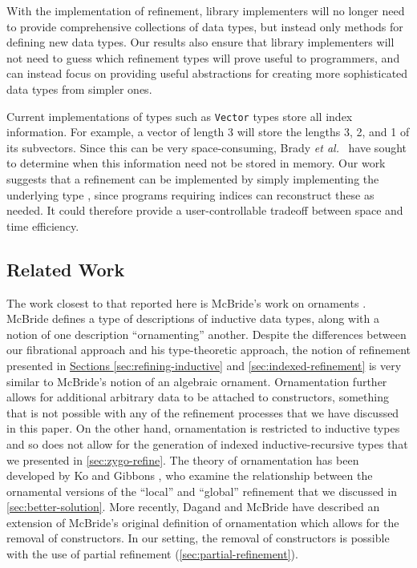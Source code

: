 \documentclass{LMCS}
\begin{document}
\vspace*{0.03in}

 With the implementation of refinement,
library implementers will no longer need to provide comprehensive
collections of data types, but instead only methods for defining new
data types. Our results also ensure that library implementers will not
need to guess which refinement types will prove useful to programmers,
and can instead focus on providing useful abstractions for creating
more sophisticated data types from simpler ones.

\vspace*{0.03in}

 Current implementations of types such
as {\tt Vector} types store all index information. For example, a
vector of length 3 will store the lengths 3, 2, and 1 of its
subvectors. Since this can be very space-consuming, Brady \emph{et
  al.}~\cite{brady03inductive} have sought to determine when this
information need not be stored in memory. Our work suggests that a
refinement  can be implemented by simply implementing
the underlying type , since programs requiring indices can
reconstruct these as needed. It could therefore provide a
user-controllable tradeoff between space and time efficiency.

\subsection{Related Work}

The work closest to that reported here is McBride's work on ornaments
\cite{mcbride10ornaments}. McBride defines a type of descriptions of
inductive data types, along with a notion of one description
``ornamenting'' another. Despite the differences between our
fibrational approach and his type-theoretic approach, the notion of
refinement presented in \hyperref[sec:refining-inductive]{Sections
  \ref*{sec:refining-inductive}} and
\hyperref[sec:indexed-refinement]{ \ref*{sec:indexed-refinement}} is
very similar to McBride's notion of an algebraic
ornament. Ornamentation further allows for additional arbitrary data
to be attached to constructors, something that is not possible with
any of the refinement processes that we have discussed in this
paper. On the other hand, ornamentation is restricted to inductive
types and so does not allow for the generation of indexed
inductive-recursive types that we presented in
\autoref{sec:zygo-refine}. The theory of ornamentation has been
developed by Ko and Gibbons \cite{KoGibbons2011OAOAOO}, who examine
the relationship between the ornamental versions of the ``local'' and
``global'' refinement that we discussed in
\autoref{sec:better-solution}. More recently, Dagand and McBride
\cite{DagandMcBride2012funOrn} have described an extension of
McBride's original definition of ornamentation which allows for the
removal of constructors. In our setting, the removal of constructors
is possible with the use of partial refinement
(\autoref{sec:partial-refinement}).
\end{document}

